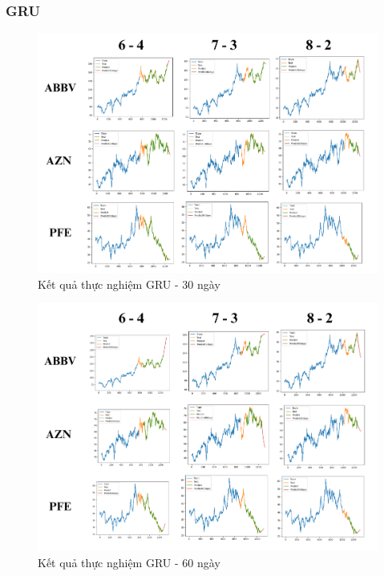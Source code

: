 \documentclass[conference]{IEEEtran}
\begin{document}
\subsubsection{GRU}
\vspace{-30pt}
\begin{figure}[H]
    \centering
    \begin{minipage}{0.5\textwidth}
    \centering
    \includegraphics[width=1\textwidth]{Image/GRU30.png}
    \caption{Kết quả thực nghiệm GRU - 30 ngày}
    \label{fig:1}
    \end{minipage}
\end{figure}
\vspace{-40pt}
\begin{figure}[H]
    \centering
    \begin{minipage}{0.5\textwidth}
    \centering
    \includegraphics[width=1\textwidth]{Image/GRU60.png}
    \caption{Kết quả thực nghiệm GRU - 60 ngày}
    \label{fig:1}
    \end{minipage}
\end{figure}
\end{document}
